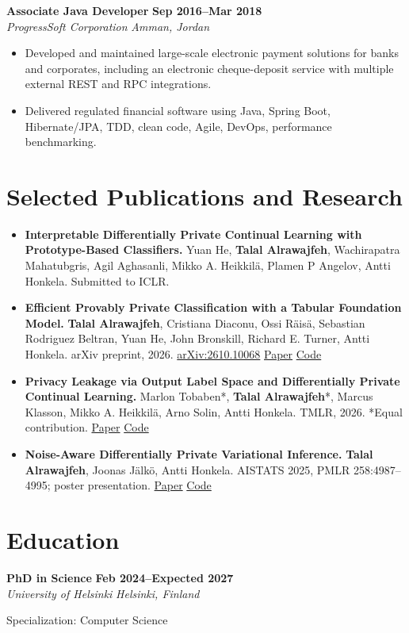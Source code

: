 \documentclass[10pt,a4paper]{article}
\newcommand{\role}[4]{%
  \textbf{#1} \hfill \textbf{#2}\\[-1pt]
  \textit{#3} \hfill \textit{#4}\par\vspace{-2pt}
}
\begin{document}
\role{Associate Java Developer}{Sep 2016--Mar 2018}{ProgressSoft Corporation}{Amman, Jordan}
\begin{itemize}
  \item Developed and maintained large-scale electronic payment solutions for banks and corporates, including an electronic cheque-deposit service with multiple external REST and RPC integrations.
  \item Delivered regulated financial software using Java, Spring Boot, Hibernate/JPA, TDD, clean code, Agile, DevOps, performance benchmarking.
\end{itemize}

\section{Selected Publications and Research}
\begin{itemize}
  \item \textbf{Interpretable Differentially Private Continual Learning with Prototype-Based Classifiers.} Yuan He, \textbf{Talal Alrawajfeh}, Wachirapatra Mahatubgris, Agil Aghasanli, Mikko A. Heikkilä, Plamen P Angelov, Antti Honkela. Submitted to ICLR.
  \item \textbf{Efficient Provably Private Classification with a Tabular Foundation Model.} \textbf{Talal Alrawajfeh}, Cristiana Diaconu, Ossi Räisä, Sebastian Rodriguez Beltran, Yuan He, John Bronskill, Richard E. Turner, Antti Honkela. arXiv preprint, 2026. \href{https://arxiv.org/abs/2610.10068}{arXiv:2610.10068} \textbar{} \href{https://arxiv.org/pdf/2610.10068}{Paper} \textbar{} \href{https://github.com/TrustworthyMLHelsinki/PrivTab}{Code}
  \item \textbf{Privacy Leakage via Output Label Space and Differentially Private Continual Learning.} Marlon Tobaben*, \textbf{Talal Alrawajfeh}*, Marcus Klasson, Mikko A. Heikkilä, Arno Solin, Antti Honkela. TMLR, 2026. *Equal contribution. \href{https://openreview.net/forum?id=ejnVWfknCm}{Paper} \textbar{} \href{https://github.com/TrustworthyMLHelsinki/dp-continual-learning}{Code}
  \item \textbf{Noise-Aware Differentially Private Variational Inference.} \textbf{Talal Alrawajfeh}, Joonas Jälkö, Antti Honkela. AISTATS 2025, PMLR 258:4987--4995; poster presentation. \href{https://proceedings.mlr.press/v258/alrawajfeh25a.html}{Paper} \textbar{} \href{https://github.com/DPBayes/noise-aware-dpvi}{Code}
\end{itemize}

\section{Education}
\role{PhD in Science}{Feb 2024--Expected 2027}{University of Helsinki}{Helsinki, Finland}
Specialization: Computer Science
\end{document}
